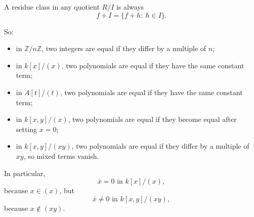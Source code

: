\documentclass[12pt,a4paper,oneside]{report}
\theoremstyle{notespace}
\begin{document}
	A residue class in any quotient \(R/I\) is always
	\[
	f+I=\{f+h:\ h\in I\}.
	\]
	
	So:
	\begin{itemize}
		\item in \(\mathbb Z/n\mathbb Z\), two integers are equal if they differ by a multiple of \(n\);
		\item in \(k[x]/(x)\), two polynomials are equal if they have the same constant term;
		\item in \(A[t]/(t)\), two polynomials are equal if they have the same constant term;
		\item in \(k[x,y]/(x)\), two polynomials are equal if they become equal after setting \(x=0\);
		\item in \(k[x,y]/(xy)\), two polynomials are equal if they differ by a multiple of \(xy\), so mixed terms vanish.
	\end{itemize}
	
	In particular,
	\[
	\bar x=0 \text{ in }k[x]/(x),
	\]
	because \(x\in (x)\), but
	\[
	\bar x\neq 0 \text{ in }k[x,y]/(xy),
	\]
	because \(x\notin (xy)\).
	
\end{document}
